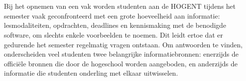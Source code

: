 
\chapter{}%
\label{ch:inleiding}

%


\section{}%
\label{sec:probleemstelling}


Bij het opnemen van een vak worden studenten aan de HOGENT tijdens het semester vaak geconfronteerd met een grote hoeveelheid aan informatie: lesmodaliteiten, opdrachten, deadlines en kennismaking met de benodigde software, om slechts enkele voorbeelden te noemen. Dit leidt ertoe dat er gedurende het semester regelmatig vragen ontstaan. Om antwoorden te vinden, onderscheiden veel studenten twee belangrijke informatiebronnen: enerzijds de officiële bronnen die door de hogeschool worden aangeboden, en anderzijds de informatie die studenten onderling met elkaar uitwisselen.

